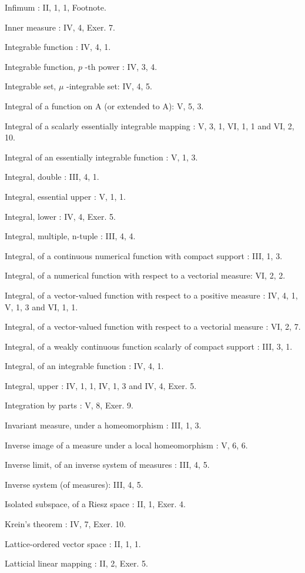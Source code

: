 Infimum : II, 1, 1, Footnote.

Inner measure : IV, 4, Exer. 7.

Integrable function : IV, 4, 1.

Integrable function, \(p\) -th power : IV, 3, 4.

Integrable set, \(\mu\) -integrable set: IV, 4, 5.

Integral of a function on A (or extended to A): V, 5, 3.

Integral of a scalarly essentially integrable mapping : V, 3, 1, VI, 1, 1 and VI, 2, 10.

Integral of an essentially integrable function : V, 1, 3.

Integral, double : III, 4, 1.

Integral, essential upper : V, 1, 1.

Integral, lower : IV, 4, Exer. 5.

Integral, multiple, n-tuple : III, 4, 4.

Integral, of a continuous numerical function with compact support : III, 1, 3.

Integral, of a numerical function with respect to a vectorial measure: VI, 2, 2.

Integral, of a vector-valued function with respect to a positive measure : IV, 4, 1, V, 1, 3 and VI, 1, 1.

Integral, of a vector-valued function with respect to a vectorial measure : VI, 2, 7.

Integral, of a weakly continuous function scalarly of compact support : III, 3, 1.

Integral, of an integrable function : IV, 4, 1.

Integral, upper : IV, 1, 1, IV, 1, 3 and IV, 4, Exer. 5.

Integration by parts : V, 8, Exer. 9.

Invariant measure, under a homeomorphism : III, 1, 3.

Inverse image of a measure under a local homeomorphism : V, 6, 6.

Inverse limit, of an inverse system of measures : III, 4, 5.

Inverse system (of measures): III, 4, 5.

Isolated subspace, of a Riesz space : II, 1, Exer. 4.

Krein's theorem : IV, 7, Exer. 10.

Lattice-ordered vector space : II, 1, 1.

Latticial linear mapping : II, 2, Exer. 5.

